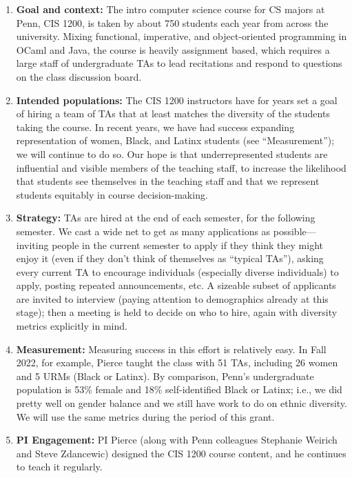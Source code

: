 \begin{enumerate}
\item {\bf Goal and context:} The intro computer science course for CS
majors at Penn, CIS 1200, is taken by about 750 students each year
from across the university.  Mixing functional, imperative, and
object-oriented programming in OCaml and Java, the course is heavily
assignment based, which requires a large staff of undergraduate TAs to
lead recitations and respond to questions on the class discussion
board.

\item {\bf Intended populations:} The CIS 1200 instructors have for years
set a goal of hiring a team of TAs that at least matches the diversity of the
students taking the course. In recent years, we have had success expanding
representation of women, Black, and Latinx students (see ``Measurement''); we
will continue to do so. Our hope is that underrepresented students are
influential and visible members of the teaching staff, to increase the
likelihood that students see themselves in the teaching staff and that we
represent students equitably in course decision-making.  

\item {\bf Strategy:} TAs are hired at the end of each semester, for
the following semester.  We cast a wide net to get as many
applications as possible---inviting people in the current semester to
apply if they think they might enjoy it (even if they don't think of
themselves as ``typical TAs''), asking every current TA to encourage
individuals (especially diverse individuals) to apply, posting
repeated announcements, etc.  A sizeable subset of applicants are
invited to interview (paying attention to demographics already at this
stage); then a meeting is held to decide on who to hire, again with
diversity metrics explicitly in mind.

\item {\bf Measurement:} Measuring success in this effort is
relatively easy.  In Fall 2022, for example, Pierce taught the class
with 51 TAs, including 26 women and 5 URMs (Black or Latinx).  By
comparison, Penn's undergraduate population is 53\% female and 18\%
self-identified Black or Latinx; i.e., we did pretty well on gender balance
and we still have work to do on ethnic diversity.  We will use the
same metrics during the period of this grant.

\item {\bf PI Engagement:} PI Pierce (along with Penn colleagues
Stephanie Weirich and Steve Zdancewic) designed the CIS 1200 course
content, and he continues to teach it regularly.
\end{enumerate}



